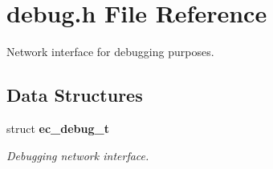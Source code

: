 \section{debug.\-h \-File \-Reference}
\label{debug_8h}


\-Network interface for debugging purposes.  


\subsection*{\-Data \-Structures}
\begin{DoxyCompactItemize}
\item 
struct {\bf ec\-\_\-debug\-\_\-t}
\begin{DoxyCompactList}\small\item\em \-Debugging network interface. \end{DoxyCompactList}\end{DoxyCompactItemize}
